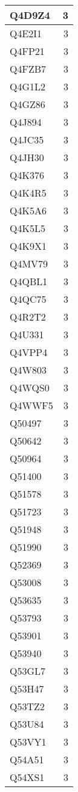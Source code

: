 \documentclass[
]{book}
\theoremstyle{definition}
\theoremstyle{definition}
\theoremstyle{definition}
\theoremstyle{definition}
\theoremstyle{remark}
\begin{document}
\begin{table}
\begin{tabular}{l|r}
\hline
Q4D9Z4 & 3\\
\hline
Q4E2I1 & 3\\
\hline
Q4FP21 & 3\\
\hline
Q4FZB7 & 3\\
\hline
Q4G1L2 & 3\\
\hline
Q4GZ86 & 3\\
\hline
Q4J894 & 3\\
\hline
Q4JC35 & 3\\
\hline
Q4JH30 & 3\\
\hline
Q4K376 & 3\\
\hline
Q4K4R5 & 3\\
\hline
Q4K5A6 & 3\\
\hline
Q4K5L5 & 3\\
\hline
Q4K9X1 & 3\\
\hline
Q4MV79 & 3\\
\hline
Q4QBL1 & 3\\
\hline
Q4QC75 & 3\\
\hline
Q4R2T2 & 3\\
\hline
Q4U331 & 3\\
\hline
Q4VPP4 & 3\\
\hline
Q4W803 & 3\\
\hline
Q4WQS0 & 3\\
\hline
Q4WWF5 & 3\\
\hline
Q50497 & 3\\
\hline
Q50642 & 3\\
\hline
Q50964 & 3\\
\hline
Q51400 & 3\\
\hline
Q51578 & 3\\
\hline
Q51723 & 3\\
\hline
Q51948 & 3\\
\hline
Q51990 & 3\\
\hline
Q52369 & 3\\
\hline
Q53008 & 3\\
\hline
Q53635 & 3\\
\hline
Q53793 & 3\\
\hline
Q53901 & 3\\
\hline
Q53940 & 3\\
\hline
Q53GL7 & 3\\
\hline
Q53H47 & 3\\
\hline
Q53TZ2 & 3\\
\hline
Q53U84 & 3\\
\hline
Q53VY1 & 3\\
\hline
Q54A51 & 3\\
\hline
Q54XS1 & 3\\

\end{tabular}
\end{table}
\end{document}
